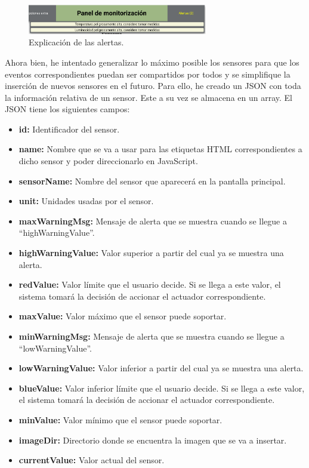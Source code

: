 \documentclass{article}
\begin{document}
\begin{figure}[H]
    \centering
    \includegraphics[width=0.7\textwidth]{images/alertamsg.png}
    \caption{Explicación de las alertas.}
\end{figure}

Ahora bien, he intentado generalizar lo máximo posible los sensores para que los eventos correspondientes puedan ser compartidos por todos y se simplifique la inserción de nuevos sensores en el futuro. Para ello, he creado un JSON con toda la información relativa de un sensor. Este a su vez se almacena en un array. El JSON tiene los siguientes campos:

\begin{itemize}
    \item \textbf{id: }Identificador del sensor.
    \item \textbf{name: }Nombre que se va a usar para las etiquetas HTML correspondientes a dicho sensor y poder direccionarlo en JavaScript.
    \item \textbf{sensorName: }Nombre del sensor que aparecerá en la pantalla principal.
    \item \textbf{unit: }Unidades usadas por el sensor.
    \item \textbf{maxWarningMsg: }Mensaje de alerta que se muestra cuando se llegue a ``highWarningValue''.
    \item \textbf{highWarningValue: }Valor superior a partir del cual ya se muestra una alerta.
    \item \textbf{redValue: }Valor límite que el usuario decide. Si se llega a este valor, el sistema tomará la decisión de accionar el actuador correspondiente.
    \item \textbf{maxValue: }Valor máximo que el sensor puede soportar.
    \item \textbf{minWarningMsg: }Mensaje de alerta que se muestra cuando se llegue a ``lowWarningValue''.
    \item \textbf{lowWarningValue: }Valor inferior a partir del cual ya se muestra una alerta.
    \item \textbf{blueValue: }Valor inferior límite que el usuario decide. Si se llega a este valor, el sistema tomará la decisión de accionar el actuador correspondiente.
    \item \textbf{minValue: }Valor mínimo que el sensor puede soportar.
    \item \textbf{imageDir: }Directorio donde se encuentra la imagen que se va a insertar.
    \item \textbf{currentValue: }Valor actual del sensor.
\end{itemize}
\end{document}
